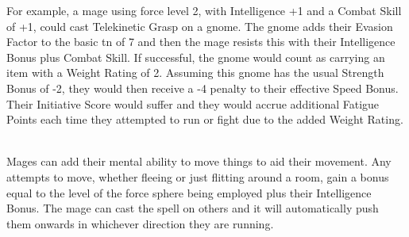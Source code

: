 \documentclass[titlepage,a4paper,openany]{book}
\begin{document}
\begin{multicols}{2}
For example, a mage using force level 2, with Intelligence +1 and a Combat Skill of +1, could cast Telekinetic Grasp on a gnome. The gnome adds their Evasion Factor to the basic \gls{tn} of 7 and then the mage resists this with their Intelligence Bonus plus Combat Skill. If successful, the gnome would count as carrying an item with a Weight Rating of 2. Assuming this gnome has the usual Strength Bonus of -2, they would then receive a -4 penalty to their effective Speed Bonus. Their Initiative Score would suffer and they would accrue additional Fatigue Points each time they attempted to run or fight due to the added Weight Rating.

\\
Mages can add their mental ability to move things to aid their movement. Any attempts to move, whether fleeing or just flitting around a room, gain a bonus equal to the level of the force sphere being employed plus their Intelligence Bonus. The mage can cast the spell on others and it will automatically push them onwards in whichever direction they are running.

\end{multicols}

\end{document}
